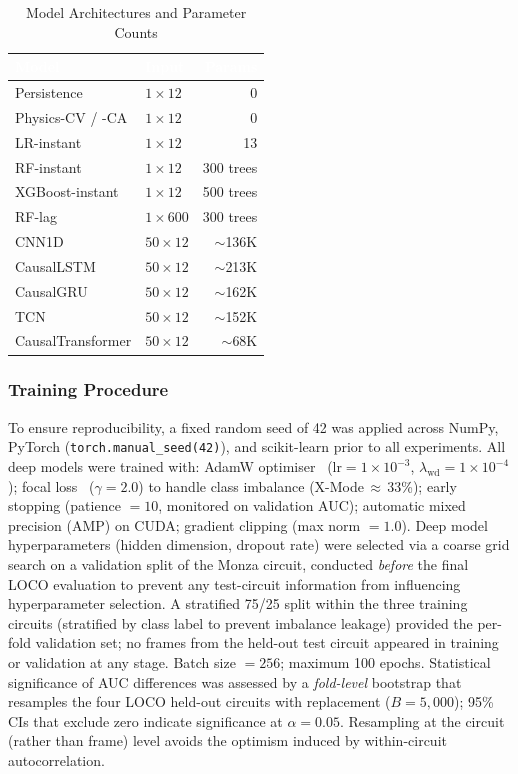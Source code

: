 \documentclass[conference,a4paper]{IEEEtran}
\begin{document}
\begin{table}[h]
\caption{Model Architectures and Parameter Counts}
\label{tab:models}
\centering
\small
\renewcommand{\arraystretch}{1.25}
\begin{tabular}{lL{2.4cm}r}
\toprule
{}
\textcolor{white}{\textbf{Model}} &
\textcolor{white}{\textbf{Input}} &
\textcolor{white}{\textbf{Params}} \\
\midrule
Persistence       & $1 \times 12$   & 0          \\
Physics-CV / -CA  & $1 \times 12$   & 0          \\
LR-instant       & $1 \times 12$   & 13         \\
RF-instant        & $1 \times 12$   & 300 trees  \\
XGBoost-instant   & $1 \times 12$   & 500 trees  \\
RF-lag            & $1 \times 600$  & 300 trees  \\
CNN1D             & $50 \times 12$  & $\sim$136K \\
CausalLSTM        & $50 \times 12$  & $\sim$213K \\
CausalGRU         & $50 \times 12$  & $\sim$162K \\
TCN               & $50 \times 12$  & $\sim$152K \\
CausalTransformer & $50 \times 12$  & $\sim$68K  \\
\bottomrule
\end{tabular}
\end{table}

\subsubsection{Training Procedure}
To ensure reproducibility, a fixed random seed of 42 was applied across NumPy,
PyTorch (\texttt{torch.manual\_seed(42)}), and scikit-learn prior to all experiments.
All deep models were trained with:
AdamW optimiser~\cite{ref_adamw} ($\text{lr} = 1 \times 10^{-3}$,
$\lambda_{\text{wd}} = 1 \times 10^{-4}$);
focal loss~\cite{ref_focal} ($\gamma = 2.0$) to handle class imbalance (X-Mode\,$\approx$\,33\%);
early stopping (patience $= 10$, monitored on validation AUC);
automatic mixed precision (AMP) on CUDA;
gradient clipping (max norm $= 1.0$).
Deep model hyperparameters (hidden dimension, dropout rate) were selected via a coarse
grid search on a validation split of the Monza circuit, conducted \emph{before} the
final LOCO evaluation to prevent any test-circuit information from influencing
hyperparameter selection.
A stratified 75/25 split within the three training circuits (stratified by class label
to prevent imbalance leakage) provided the per-fold validation set; no frames from the
held-out test circuit appeared in training or validation at any stage.
Batch size $= 256$; maximum 100 epochs.
Statistical significance of AUC differences was assessed by a \emph{fold-level} bootstrap
that resamples the four LOCO held-out circuits with replacement ($B = 5{,}000$); 95\% CIs
that exclude zero indicate significance at $\alpha = 0.05$. Resampling at the circuit
(rather than frame) level avoids the optimism induced by within-circuit autocorrelation.
\end{document}
